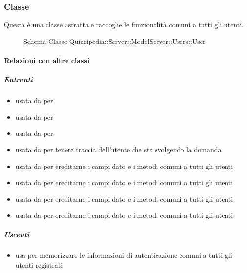 \subsubsection{Classe }
Questa è una classe astratta e raccoglie le funzionalità comuni a tutti gli utenti.
\begin{figure}[H]
\centering
\noindent{}
\caption[Schema Classe User]{Schema Classe Quizzipedia::Server::ModelServer::Users::User}
\end{figure}
\paragraph{Relazioni con altre classi}
\subparagraph{Entranti}
\begin{itemize}
\item usata da  per 
\item usata da  per 
\item usata da  per 
\item usata da  per tenere traccia dell'utente che sta svolgendo la domanda
\item usata da  per ereditarne i campi dato e i metodi comuni a tutti gli utenti
\item usata da  per ereditarne i campi dato e i metodi comuni a tutti gli utenti
\item usata da  per ereditarne i campi dato e i metodi comuni a tutti gli utenti
\item usata da  per ereditarne i campi dato e i metodi comuni a tutti gli utenti
\end{itemize}
\subparagraph{Uscenti}
\begin{itemize}
\item usa  per memorizzare le informazioni di autenticazione comuni a tutti gli utenti registrati
\end{itemize}
